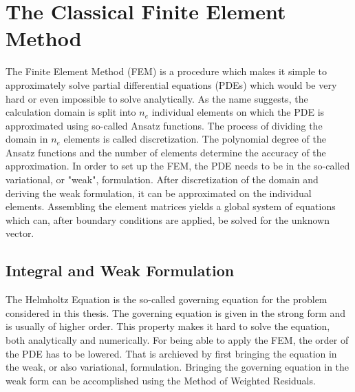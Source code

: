 \documentclass[%
  a4paper,oneside,%
  11pt,%
  smallchapters,
  green,%
  rgb, <cmyk>
  ]{tubsbook}
\begin{document}
\section{The Classical Finite Element Method}


The Finite Element Method (FEM) is a procedure which makes it simple to approximately solve partial differential equations (PDEs) which would be very hard or even impossible to solve analytically. As the name suggests, the calculation domain is split into $n_e$ individual elements on which the PDE is approximated using so-called Ansatz functions. The process of dividing the domain in $n_e$ elements is called discretization. The polynomial degree of the Ansatz functions and the number of elements determine the accuracy of the approximation. In order to set up the FEM, the PDE needs to be in the so-called variational, or "weak", formulation. 
After discretization of the domain and deriving the weak formulation, it can be approximated on the individual elements. Assembling the element matrices yields a global system of equations which can, after boundary conditions are applied, be solved for the unknown vector.


\subsection{Integral and Weak Formulation}
The Helmholtz Equation is the so-called governing equation for the problem considered in this thesis. The governing equation is given in the strong form and is usually of higher order. This property makes it hard to solve the equation, both analytically and numerically. For being able to apply the FEM, the order of the PDE has to be lowered. That is archieved by first bringing the equation in the weak, or also variational, formulation.
Bringing the governing equation in the weak form can be accomplished using the Method of Weighted Residuals. 
\end{document}
